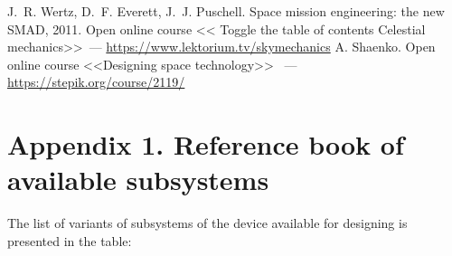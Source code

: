 \documentclass[12pt,a4paper]{article}
\begin{document}
\begin{thebibliography}{2}
 J.~R. Wertz, D.~F. Everett, J.~J. Puschell. Space mission
engineering: the new SMAD, 2011.
 Open online course <<
Toggle the table of contents
Celestial mechanics>>~---
  \url{https://www.lektorium.tv/skymechanics}
 A. Shaenko. Open online course <<Designing space technology>> ~---
  \url{https://stepik.org/course/2119/}
\end{thebibliography}

\section*{Appendix 1. Reference book of available subsystems}
\label{Sec:Subsystems}

The list of variants of subsystems of the device available for designing is presented in the table:
\end{document}
